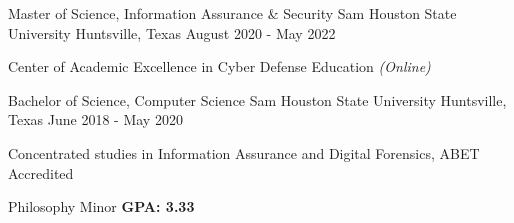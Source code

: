 \begin{cventries}

  \cventry
	{Master of Science, Information Assurance \& Security} %
	{Sam Houston State University} %
	{Huntsville, Texas} %
	{August 2020 - May 2022} %
	{
    \begin{cvitems}
      \item {Center of Academic Excellence in Cyber Defense Education \hfill \textit{(Online)}}
    \end{cvitems}
  }

  \cventry
    {Bachelor of Science, Computer Science} %
    {Sam Houston State University} %
    {Huntsville, Texas} %
    {June 2018 - May 2020} %
    {
      \begin{cvitems} %
        \item{Concentrated studies in Information Assurance and Digital Forensics, ABET Accredited}
        \item{Philosophy Minor \hfill \textbf{GPA: 3.33}}        
      \end{cvitems}
    }
\end{cventries}
